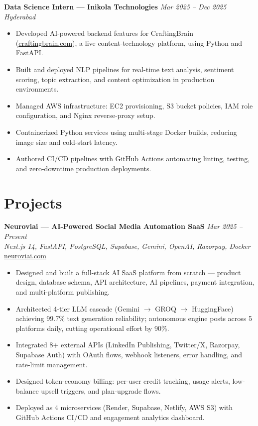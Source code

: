 \documentclass[11pt]{article}
\begin{document}
\vspace{4pt}
\textbf{Data Science Intern --- Inikola Technologies} \hfill \textit{Mar 2025 -- Dec 2025} \\
\textit{Hyderabad}
\begin{itemize}
  \item Developed AI-powered backend features for CraftingBrain (\href{https://craftingbrain.com}{craftingbrain.com}), a live content-technology platform, using Python and FastAPI.
  \item Built and deployed NLP pipelines for real-time text analysis, sentiment scoring, topic extraction, and content optimization in production environments.
  \item Managed AWS infrastructure: EC2 provisioning, S3 bucket policies, IAM role configuration, and Nginx reverse-proxy setup.
  \item Containerized Python services using multi-stage Docker builds, reducing image size and cold-start latency.
  \item Authored CI/CD pipelines with GitHub Actions automating linting, testing, and zero-downtime production deployments.
\end{itemize}

\section*{Projects}

\textbf{Neuroviai --- AI-Powered Social Media Automation SaaS} \hfill \textit{Mar 2025 -- Present} \\
\textit{Next.js 14, FastAPI, PostgreSQL, Supabase, Gemini, OpenAI, Razorpay, Docker} \hfill \href{https://neuroviai.com}{neuroviai.com}
\begin{itemize}
  \item Designed and built a full-stack AI SaaS platform from scratch --- product design, database schema, API architecture, AI pipelines, payment integration, and multi-platform publishing.
  \item Architected 4-tier LLM cascade (Gemini $\rightarrow$ GROQ $\rightarrow$ HuggingFace) achieving 99.7\% text generation reliability; autonomous engine posts across 5 platforms daily, cutting operational effort by 90\%.
  \item Integrated 8+ external APIs (LinkedIn Publishing, Twitter/X, Razorpay, Supabase Auth) with OAuth flows, webhook listeners, error handling, and rate-limit management.
  \item Designed token-economy billing: per-user credit tracking, usage alerts, low-balance upsell triggers, and plan-upgrade flows.
  \item Deployed as 4 microservices (Render, Supabase, Netlify, AWS S3) with GitHub Actions CI/CD and engagement analytics dashboard.
\end{itemize}
\end{document}
